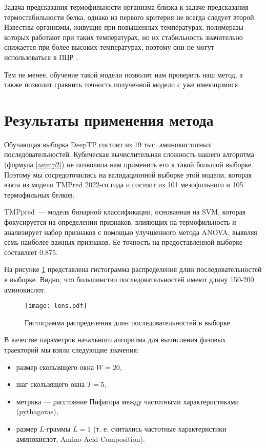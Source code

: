 Задача предсказания термофильности организма близка к задаче предсказания термостабильности белка, однако из первого критерия не всегда следует второй. Известны организмы, живущие при повышенных температурах, полимеразы которых работают при таких температурах, но их стабильность значительно снижается при более высоких температурах, поэтому они не могут использоваться в ПЦР \cite{bulygin}.

Тем не менее, обучение такой модели позволит нам проверить наш метод, а также позволит сравнить точность полученной модели с уже имеющимися.

\section{Результаты применения метода}

Обучающая выборка DeepTP состоит из 19 тыс. аминокислотных последовательностей. Кубическая вычислительная сложность нашего алгоритма (формула \ref{asimp2}) не позволила нам применить его к такой большой выборке. Поэтому мы сосредоточились на валидационной выборке этой модели, которая взята из модели TMPred \cite{Meng2022} 2022-го года и состоит из 101 мезофильного и 105 термофильных белков.

TMPpred~--- модель бинарной классификации, основанная на SVM, которая фокусируется на определении признаков, влияющих на термофильность и анализирует набор признаков с помощью улучшенного метода ANOVA, выявляя семь наиболее важных признаков. Ее точность на предоставленной выборке составляет 0.875.

На рисунке \ref{lens} представлена гистограмма распределения длин последовательностей в выборке. Видно, что большинство последовательностей имеют длину 150-200 аминокислот.

\begin{figure}[htb]
  \centering
  \texttt{[image: lens.pdf]}
  \caption{Гистограмма распределения длин последовательностей в выборке}
  \label{lens}
\end{figure}

В качестве параметров начального алгоритма для вычисления фазовых траекторий мы взяли следующие значения:

\begin{itemize}
  \item размер скользящего окна $W = 20$,
  \item шаг скользящего окна $T = 5$,
  \item метрика --- расстояние Пифагора между частотными характеристиками (pythagoras), 
  \item размер $L$-граммы $L = 1$ (т. е. считались частотные характеристики аминокислот, Amino Acid Composition).
\end{itemize}

